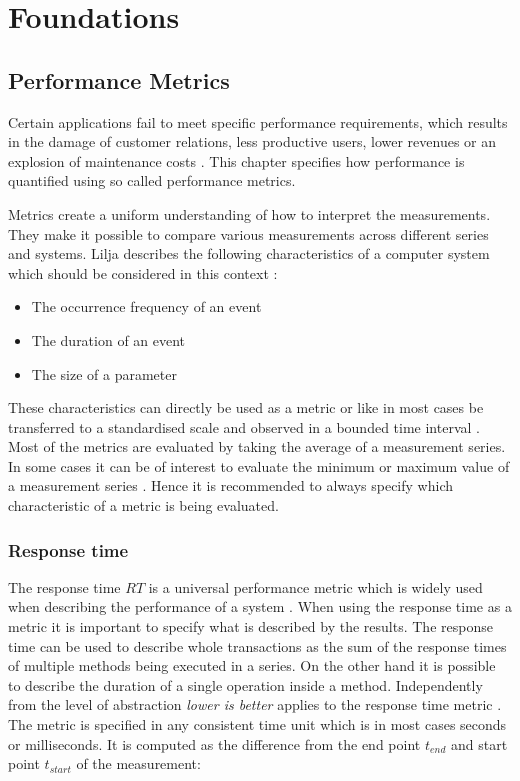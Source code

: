 
\chapter{Foundations}
\label{cha:foundations}

\section{Performance Metrics}
\label{sec:performance-metrics}
Certain applications fail to meet specific performance requirements, which results in the damage of customer relations, less productive users, lower revenues or an explosion of maintenance costs \cite{smith.1998}. This chapter specifies how performance is quantified using so called performance metrics.

Metrics create a uniform understanding of how to interpret the measurements. They make it possible to compare various measurements across different series and systems. Lilja describes the following characteristics of a computer system which should be considered in this context \cite[9]{lilja.2005}:

\begin{itemize}
  \item The occurrence frequency of an event
  \item The duration of an event
  \item The size of a parameter
\end{itemize}

These characteristics can directly be used as a metric or like in most cases be transferred to a standardised scale and observed in a bounded time interval \cite[9]{lilja.2005}. Most of the metrics are evaluated by taking the average of a measurement series. In some cases it can be of interest to evaluate the minimum or maximum value of a measurement series \cite[48]{jain.2008}. Hence it is recommended to always specify which characteristic of a metric is being evaluated.

\subsection*{Response time}
The response time $RT$ is a universal performance metric which is widely used when describing the performance of a system \cite{lilja.2005, cortellessa.2007}. When using the response time as a metric it is important to specify what is described by the results. The response time can be used to describe whole transactions as the sum of the response times of multiple methods being executed in a series. On the other hand it is possible to describe the duration of a single operation inside a method. Independently from the level of abstraction \emph{lower is better} applies to the response time metric \cite[54]{jain.2008}. The metric is specified in any consistent time unit which is in most cases seconds or milliseconds. It is computed as the difference from the end point $t_{end}$ and start point $t_{start}$ of the measurement:

